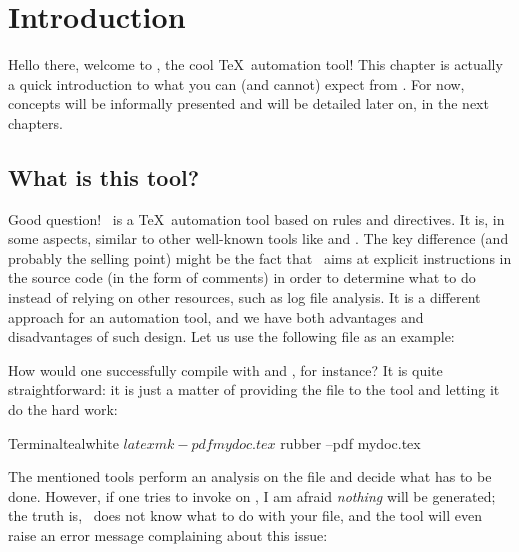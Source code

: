 \chapter{Introduction}
\label{chap:introduction}

Hello there, welcome to \arara, the cool \TeX\ automation tool! This chapter is actually a quick introduction to what you can (and cannot) expect from \arara. For now, concepts will be informally presented and will be detailed later on, in the next chapters.

\section{What is this tool?}
\label{sec:whatisthistool}

Good question! \arara\ is a \TeX\ automation tool based on rules and directives. It is, in some aspects, similar to other well-known tools like  and . The key difference (and probably the selling point) might be the fact that \arara\ aims at explicit instructions in the source code (in the form of comments) in order to determine what to do instead of relying on other resources, such as log file analysis. It is a different approach for an automation tool, and we have both advantages and disadvantages of such design. Let us use the following file  as an example:


How would one successfully compile  with  and , for instance? It is quite straightforward: it is just a matter of providing the file to the tool and letting it do the hard work:

\begin{codebox}{Terminal}{teal}{\icnote}{white}
$ latexmk -pdf mydoc.tex
$ rubber --pdf mydoc.tex
\end{codebox}

The mentioned tools perform an analysis on the file and decide what has to be done. However, if one tries to invoke  on , I am afraid \emph{nothing} will be generated; the truth is, \arara\ does not know what to do with your file, and the tool will even raise an error message complaining about this issue:

